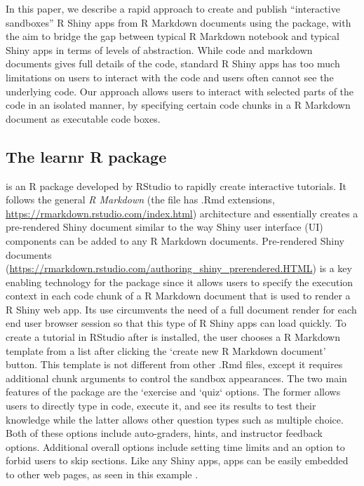 In this paper, we describe a rapid approach to create and publish
``interactive sandboxes'' R Shiny apps from R Markdown documents using
the  package, with the aim to bridge the gap between
typical R Markdown notebook and typical Shiny apps in terms of levels of
abstraction. While code and markdown documents gives full details of the
code, standard R Shiny apps has too much limitations on users to
interact with the code and users often cannot see the underlying code.
Our approach allows users to interact with selected parts of the code in
an isolated manner, by specifying certain code chunks in a R Markdown
document as executable code boxes.

\hypertarget{the-learnr-r-package}{%
\subsection{\texorpdfstring{The learnr R
package}{The learnr R package}}\label{the-learnr-r-package}}

 \citep{learnr} is an R package developed by RStudio to
rapidly create interactive tutorials. It follows the general \textit{R
Markdown} (the file has .Rmd extensions,
\url{https://rmarkdown.rstudio.com/index.html}) architecture and
essentially creates a pre-rendered Shiny document similar to the way
Shiny user interface (UI) components can be added to any R Markdown documents.
Pre-rendered Shiny documents
(\url{https://rmarkdown.rstudio.com/authoring_shiny_prerendered.HTML})
is a key enabling technology for the  package since it
allows users to specify the execution context in each code chunk of a R
Markdown document that is used to render a R Shiny web app. Its use
circumvents the need of a full document render for each end user browser
session so that this type of R Shiny apps can load quickly. To create a
 tutorial in RStudio after  is
installed, the user chooses a  R Markdown template from
a list after clicking the `create new R Markdown document' button. This
template is not different from other .Rmd files, except it requires
additional chunk arguments to control the sandbox appearances. The two
main features of the  package are the `exercise and
`quiz` options. The former allows users to directly type in code,
execute it, and see its results to test their knowledge while the latter
allows other question types such as multiple choice. Both of these
options include auto-graders, hints, and instructor feedback options.
Additional overall options include setting time limits and an option to
forbid users to skip sections. Like any Shiny apps, 
apps can be easily embedded to other web pages, as seen in this example
\citep{rmrwr}.

